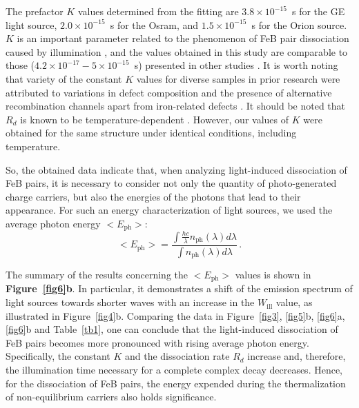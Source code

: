 \documentclass{WileyMSP-template}
\begin{document}
The prefactor $K$ values determined from the fitting are
$3.8\times10^{-15}$~s for the GE light source,
$2.0\times10^{-15}$~s for the Osram, and
$1.5\times10^{-15}$~s for the Orion source.
$K$ is an important parameter related to the phenomenon of FeB pair dissociation caused by illumination \cite{FeBKin2019},
and the values obtained in this study are comparable to those ($4.2\times10^{-17}-5\times10^{-15}$~s) presented in other studies \cite{FeBLight2,FeBAssJAP2014,FeBKin2019}.
It is worth noting that variety of the constant $K$ values for diverse samples in prior research were attributed
to variations in defect composition and the presence of alternative recombination channels apart from iron-related defects \cite{FeBLight2,FeBAssJAP2014}.
It should be noted that $R_d$ is known to be temperature-dependent \cite{Lagowskii1993}.
However, our values of $K$ were obtained for the same structure under identical conditions, including temperature.

So, the obtained data indicate that, when analyzing light-induced dissociation of FeB pairs,
it is necessary to consider not only the quantity of photo-generated charge carriers,
but also the energies of the photons that lead to their appearance.
For such an energy characterization of light sources, we used the average photon energy $<E_\mathrm{ph}>$:
\begin{equation}
\label{eqEaver}
<E_\mathrm{ph}>=\frac{\int \frac{hc}{\lambda}n_\mathrm{ph}(\lambda)d\lambda}{\int n_\mathrm{ph}(\lambda)d\lambda}\,.
\end{equation}


The summary of the results concerning the $<E_\mathrm{ph}>$ values is shown in \textbf{Figure~\ref{fig6}b}.
In particular, it demonstrates a shift of the emission spectrum of light sources
towards shorter waves with an increase in the $W_\mathrm{ill}$ value, as illustrated in Figure~\ref{fig4}b.
Comparing the data in Figure~\ref{fig3}, \ref{fig5}b, \ref{fig6}a, \ref{fig6}b and Table~\ref{tb1}, one can conclude that
the light-induced dissociation of FeB pairs becomes more pronounced with rising average photon energy.
Specifically, the constant $K$ and the dissociation rate $R_d$ increase and, therefore, the illumination time necessary for a complete complex decay decreases.
Hence, for the dissociation of FeB pairs, the energy expended during the thermalization of non-equilibrium carriers also holds significance.
\end{document}
